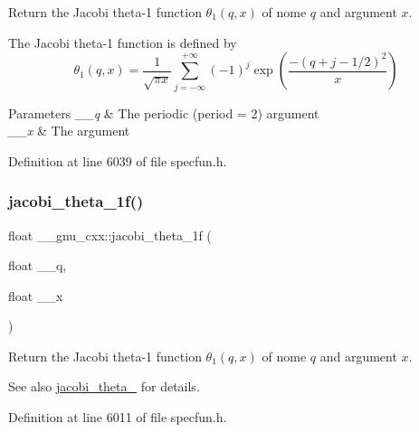 Return the Jacobi theta-\/1 function $ \theta_1(q,x) $ of nome $ q $ and argument $ x $.

The Jacobi theta-\/1 function is defined by \[ \theta_1(q,x) = \frac{1}{\sqrt{\pi x}} \sum_{j=-\infty}^{+\infty} (-1)^j \exp\left( \frac{-(q + j - 1/2)^2}{x} \right) \]


\begin{DoxyParams}{Parameters}
{\em \+\_\+\+\_\+q} & The periodic (period = 2) argument \\
\hline
{\em \+\_\+\+\_\+x} & The argument \\
\hline
\end{DoxyParams}


Definition at line 6039 of file specfun.\+h.

\mbox{\label{group__gnu__math__spec__func_gacccd2107c26e39400e589a59e0af674a}} 
\subsubsection{\texorpdfstring{jacobi\+\_\+theta\+\_\+1f()}{jacobi\_theta\_1f()}}
{\footnotesize\ttfamily float \+\_\+\+\_\+gnu\+\_\+cxx\+::jacobi\+\_\+theta\+\_\+1f (\begin{DoxyParamCaption}\item[{float}]{\+\_\+\+\_\+q,  }\item[{float}]{\+\_\+\+\_\+x }\end{DoxyParamCaption})\hspace{0.3cm}{\ttfamily [inline]}}

Return the Jacobi theta-\/1 function $ \theta_1(q,x) $ of nome $ q $ and argument $ x $.

\begin{DoxySeeAlso}{See also}
\hyperlink{group__gnu__math__spec__func_ga996ca8c1fff75e2d4f196e99e0919933}{jacobi\+\_\+theta\+\_} for details. 
\end{DoxySeeAlso}


Definition at line 6011 of file specfun.\+h.

\mbox{\label{group__gnu__math__spec__func_ga823eba555ecac89556a0f4c1e62dbc5a}} 
